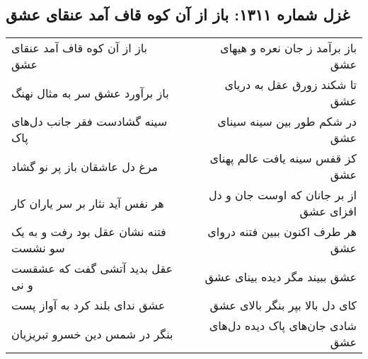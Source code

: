 \begin{center}
\section*{غزل شماره ۱۳۱۱: باز از آن کوه قاف آمد عنقای عشق}
\label{sec:1311}
\begin{longtable}{l p{0.5cm} r}
باز از آن کوه قاف آمد عنقای عشق
&&
باز برآمد ز جان نعره و هیهای عشق
\\
باز برآورد عشق سر به مثال نهنگ
&&
تا شکند زورق عقل به دریای عشق
\\
سینه گشادست فقر جانب دل‌های پاک
&&
در شکم طور بین سینه سینای عشق
\\
مرغ دل عاشقان باز پر نو گشاد
&&
کز قفس سینه یافت عالم پهنای عشق
\\
هر نفس آید نثار بر سر یاران کار
&&
از بر جانان که اوست جان و دل افزای عشق
\\
فتنه نشان عقل بود رفت و به یک سو نشست
&&
هر طرف اکنون ببین فتنه دروای عشق
\\
عقل بدید آتشی گفت که عشقست و نی
&&
عشق ببیند مگر دیده بینای عشق
\\
عشق ندای بلند کرد به آواز پست
&&
کای دل بالا بپر بنگر بالای عشق
\\
بنگر در شمس دین خسرو تبریزیان
&&
شادی جان‌های پاک دیده دل‌های عشق
\\
\end{longtable}
\end{center}
